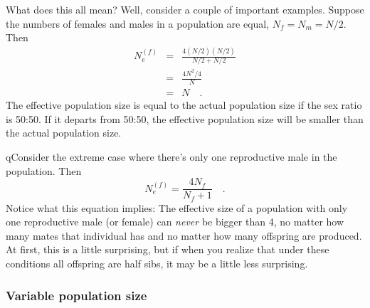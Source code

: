 \documentclass[12pt]{article}
\begin{document}
What does this all mean? Well, consider a couple of important
examples. Suppose the numbers of females and males in a population are
equal, $N_f = N_m = N/2$. Then
\begin{eqnarray*}
N_e^{(f)} &=& \frac{4(N/2)(N/2)}{N/2 + N/2} \\
          &=& \frac{4N^2/4}{N} \\
          &=& N \quad .
\end{eqnarray*}
The effective population size is equal to the actual population size
if the sex ratio is 50:50. If it departs from 50:50, the effective
population size will be smaller than the actual population
size.

qConsider the extreme case where there's only one reproductive
male in the population. Then
\begin{equation}
N_e^{(f)} = \frac{4N_f}{N_f + 1} \quad . \label{eq:ne-harem}
\end{equation}
Notice what this equation implies: The effective size of a population
with only one reproductive male (or female) can {\it never\/} be
bigger than 4, no matter how many mates that individual has and no
matter how many offspring are produced. At first, this is a little
surprising, but if when you realize that under these conditions all
offspring are half sibs, it may be a little less surprising.

\subsubsection*{Variable population size}
\end{document}
